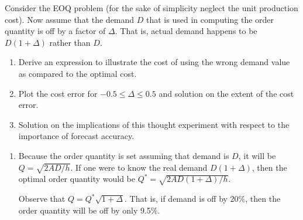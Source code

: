 \begin{question}
Consider the EOQ problem (for the sake of simplicity neglect the unit production cost). Now assume that the demand $D$ that is used in computing the order quantity is off by a factor of $\Delta$. That is, actual demand happens to be $D(1+\Delta)$ rather than $D$. 
\begin{enumerate}
\item Derive an expression to illustrate the cost of using the wrong demand value as compared to the optimal cost. 
\item Plot the cost error for $-0.5\leq \Delta\leq 0.5$ and solution on the extent of the cost error.
\item Solution on the implications of this thought experiment with respect to the importance of forecast accuracy.
\end{enumerate}

  \begin{solution}
\begin{enumerate}
\item Because the order quantity is set assuming that demand is $D$, it will be $Q=\sqrt{2AD/h}$. If one were to know the real demand $D(1+\Delta)$, then the optimal order quantity would be $Q^*=\sqrt{2AD(1+\Delta)/h}$. 

Observe that $Q=Q^*\sqrt{1+\Delta}$. That is, if demand is off by 20\%, then the order quantity will be off by only 9.5\%.


\end{enumerate}
\end{solution}
\end{question}
